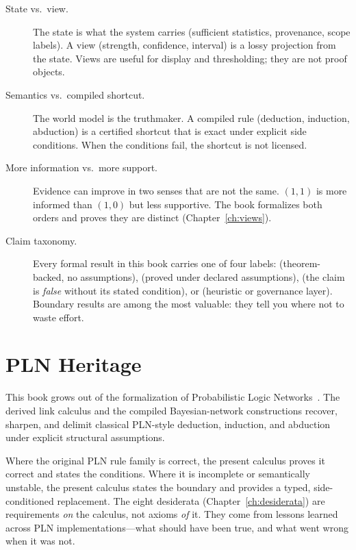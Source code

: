 \documentclass[11pt,openany]{report}
\begin{document}
\begin{description}
\item[State vs.\ view.]  The state is what the system carries
  (sufficient statistics, provenance, scope labels).  A view
  (strength, confidence, interval) is a lossy projection from
  the state.  Views are useful for display and thresholding;
  they are not proof objects.

\item[Semantics vs.\ compiled shortcut.]  The world model is the
  truthmaker.  A compiled rule (deduction, induction, abduction)
  is a certified shortcut that is exact under explicit side
  conditions.  When the conditions fail, the shortcut is not
  licensed.

\item[More information vs.\ more support.]  Evidence can improve
  in two senses that are not the same.  $(1, 1)$ is more informed
  than $(1, 0)$ but less supportive.  The book formalizes both
  orders and proves they are distinct
  (Chapter~\ref{ch:views}).

\item[Claim taxonomy.]  Every formal result in this book carries
  one of four labels:
  \claimCore{} (theorem-backed, no assumptions),
  \claimConditional{} (proved under declared assumptions),
  \claimBoundary{} (the claim is \emph{false} without its stated
  condition), or
  \claimOperational{} (heuristic or governance layer).
  Boundary results are among the most valuable: they tell you
  where not to waste effort.
\end{description}


\section{PLN Heritage}

This book grows out of the formalization of Probabilistic Logic
Networks~\cite{Goertzel2008PLN}.  The derived link calculus and
the compiled Bayesian-network constructions recover, sharpen, and
delimit classical PLN-style deduction, induction, and abduction
under explicit structural assumptions.

Where the original PLN rule family is correct, the present
calculus proves it correct and states the conditions.  Where it is
incomplete or semantically unstable, the present calculus states
the boundary and provides a typed, side-conditioned replacement.
The eight desiderata (Chapter~\ref{ch:desiderata}) are
requirements \emph{on} the calculus, not axioms \emph{of} it.
They come from lessons learned across PLN implementations---what
should have been true, and what went wrong when it was not.
\end{document}
